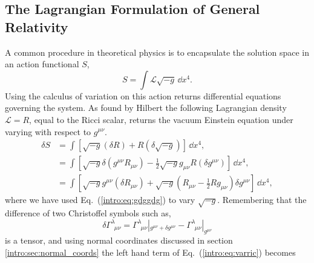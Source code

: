 


\subsection{The Lagrangian Formulation of General Relativity}\label{intro:sec:gr_from_lagrangean}
A common procedure in theoretical physics is to encapsulate the solution space in an action functional $S$,
\begin{equation}
S = \int \mathcal{L} \sqrt{-g} \,\dd x^4.
\end{equation}
Using the calculus of variation on this action returns differential equations governing the system. As found by Hilbert \cite{hilbert1915grundlagen} the following Lagrangian density $\mathcal{L}=R$, equal to the Ricci scalar, returns the vacuum Einstein equation under varying with respect to $g^{\mu\nu}$.
\begin{align}
\delta S &= \int \left[\sqrt{-g} (\delta R) + R (\delta \sqrt{-g})\right]\,\dd x^4, \\
&= \int \left[\sqrt{-g} \delta(g^{\mu\nu}R_{\mu\nu}) -\frac{1}{2} \sqrt{-g} g_{\mu\nu}R (\delta g^{\mu\nu})\right]\,\dd x^4, \\
&= \int \left[\sqrt{-g}g^{\mu\nu}(\delta R_{\mu\nu}) + \sqrt{-g}\left(R_{\mu\nu}-\frac{1}{2}R g_{\mu\nu} \right)\delta g^{\mu\nu}\right]\,\dd x^4 \label{intro:eq:varric},
\end{align}  
where we have used Eq.~(\ref{intro:eq:gdggdg}) to vary $\sqrt{-g}$. Remembering that the difference of two Christoffel symbols such as,
\begin{equation}
\delta \Gamma^{\lambda}_{\,\,\,\mu\nu} = \Gamma^{\lambda}_{\,\,\,\mu\nu}|_{g^{\mu\nu}+\delta g^{\mu\nu}} - \Gamma^{\lambda}_{\,\,\,\mu\nu}|_{g^{\mu\nu}}
\end{equation} 
is a tensor, and using normal coordinates discussed in section \ref{intro:sec:normal_coords} the left hand term of Eq.~(\ref{intro:eq:varric}) becomes
